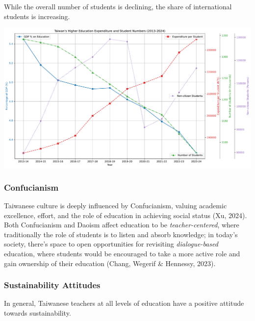 \documentclass[
  letterpaper,
  DIV=11,
  numbers=noendperiod]{scrartcl}
\begin{document}
While the overall number of students is declining, the share of
international students is increasing.

\includegraphics{_thesis_files/figure-pdf/cell-6-output-1.pdf}

\subsubsection{Confucianism}\label{confucianism}

Taiwanese culture is deeply influenced by Confucianism, valuing academic
excellence, effort, and the role of education in achieving social status
(Xu, 2024). Both Confucianism and Daoism affect education to be
\emph{teacher-centered}, where traditionally the role of students is to
listen and absorb knowledge; in today's society, there's space to open
opportunities for revisiting \emph{dialogue-based} education, where
students would be encouraged to take a more active role and gain
ownership of their education (Chang, Wegerif \& Hennessy, 2023).

\subsubsection{Sustainability Attitudes}\label{sustainability-attitudes}

In general, Taiwanese teachers at all levels of education have a
positive attitude towards sustainability.
\end{document}
